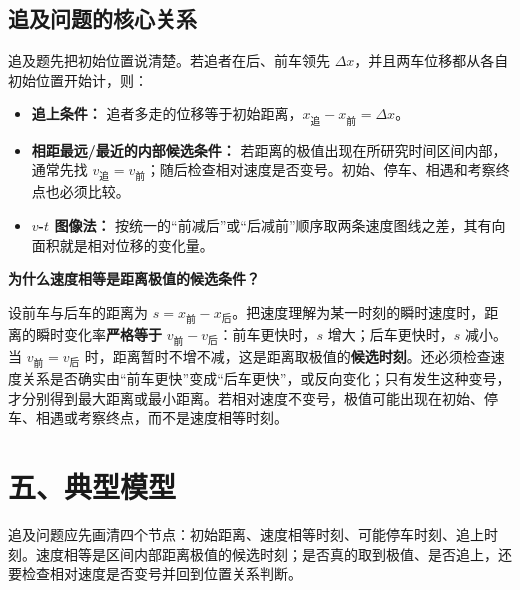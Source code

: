 \subsection*{追及问题的核心关系}

追及题先把初始位置说清楚。若追者在后、前车领先 $\Delta x$，并且两车位移都从各自初始位置开始计，则：
\begin{itemize}
  \item \textbf{追上条件：} 追者多走的位移等于初始距离，$x_{\text{追}} - x_{\text{前}} = \Delta x$。
  \item \textbf{相距最远/最近的内部候选条件：} 若距离的极值出现在所研究时间区间内部，通常先找 $v_{\text{追}} = v_{\text{前}}$；随后检查相对速度是否变号。初始、停车、相遇和考察终点也必须比较。
  \item \textbf{$v$-$t$ 图像法：} 按统一的“前减后”或“后减前”顺序取两条速度图线之差，其有向面积就是相对位移的变化量。
\end{itemize}

\textbf{为什么速度相等是距离极值的候选条件？}

设前车与后车的距离为 $s=x_{\text{前}}-x_{\text{后}}$。把速度理解为某一时刻的瞬时速度时，距离的瞬时变化率\textbf{严格等于} $v_{\text{前}}-v_{\text{后}}$：前车更快时，$s$ 增大；后车更快时，$s$ 减小。当 $v_{\text{前}}=v_{\text{后}}$ 时，距离暂时不增不减，这是距离取极值的\textbf{候选时刻}。还必须检查速度关系是否确实由“前车更快”变成“后车更快”，或反向变化；只有发生这种变号，才分别得到最大距离或最小距离。若相对速度不变号，极值可能出现在初始、停车、相遇或考察终点，而不是速度相等时刻。

\begin{center}


\label{fig:xt-chase-two-objects}
\end{center}

\begin{center}


\label{fig:chase-scenarios}
\end{center}

\section*{五、典型模型}

追及问题应先画清四个节点：初始距离、速度相等时刻、可能停车时刻、追上时刻。速度相等是区间内部距离极值的候选时刻；是否真的取到极值、是否追上，还要检查相对速度是否变号并回到位置关系判断。

